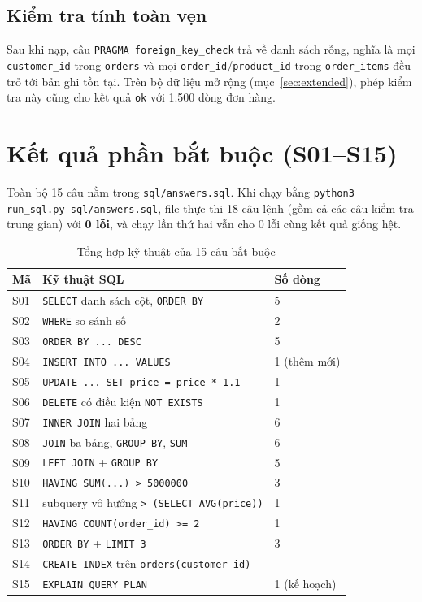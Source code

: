 \documentclass[12pt,a4paper]{article}
\newcommand{\code}[1]{\texttt{\small #1}}
\begin{document}
\subsection{Kiểm tra tính toàn vẹn}

Sau khi nạp, câu \code{PRAGMA foreign\_key\_check} trả về danh sách rỗng, nghĩa là mọi
\code{customer\_id} trong \code{orders} và mọi \code{order\_id}/\code{product\_id} trong
\code{order\_items} đều trỏ tới bản ghi tồn tại. Trên bộ dữ liệu mở rộng (mục~\ref{sec:extended}),
phép kiểm tra này cũng cho kết quả \code{ok} với 1.500 dòng đơn hàng.

\section{Kết quả phần bắt buộc (S01--S15)}

Toàn bộ 15 câu nằm trong \code{sql/answers.sql}. Khi chạy bằng
\code{python3 run\_sql.py sql/answers.sql}, file thực thi 18 câu lệnh (gồm cả các câu kiểm tra
trung gian) với \textbf{0 lỗi}, và chạy lần thứ hai vẫn cho 0 lỗi cùng kết quả giống hệt.

\begin{table}[H]
\centering
\caption{Tổng hợp kỹ thuật của 15 câu bắt buộc}
\label{tab:s01s15}
\small
\begin{tabularx}{\linewidth}{@{}l X l@{}}
\toprule
\textbf{Mã} & \textbf{Kỹ thuật SQL} & \textbf{Số dòng} \\
\midrule
S01 & \code{SELECT} danh sách cột, \code{ORDER BY} & 5 \\
S02 & \code{WHERE} so sánh số & 2 \\
S03 & \code{ORDER BY ... DESC} & 5 \\
S04 & \code{INSERT INTO ... VALUES} & 1 (thêm mới) \\
S05 & \code{UPDATE ... SET price = price * 1.1} & 1 \\
S06 & \code{DELETE} có điều kiện \code{NOT EXISTS} & 1 \\
S07 & \code{INNER JOIN} hai bảng & 6 \\
S08 & \code{JOIN} ba bảng, \code{GROUP BY}, \code{SUM} & 6 \\
S09 & \code{LEFT JOIN} + \code{GROUP BY} & 5 \\
S10 & \code{HAVING SUM(...) > 5000000} & 3 \\
S11 & subquery vô hướng \code{> (SELECT AVG(price))} & 1 \\
S12 & \code{HAVING COUNT(order\_id) >= 2} & 1 \\
S13 & \code{ORDER BY} + \code{LIMIT 3} & 3 \\
S14 & \code{CREATE INDEX} trên \code{orders(customer\_id)} & --- \\
S15 & \code{EXPLAIN QUERY PLAN} & 1 (kế hoạch) \\
\bottomrule
\end{tabularx}
\end{table}
\end{document}
